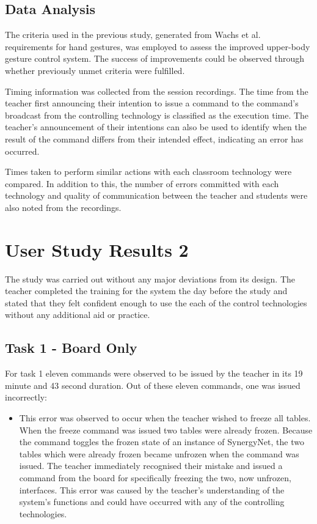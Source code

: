 \documentclass[manuscript, review, screen]{acmart}
\begin{document}
\subsection{Data Analysis}

The criteria used in the previous study, generated from Wachs et al.~\cite{Wachs2011} requirements for hand gestures, was employed to assess the improved upper-body gesture control system.
The success of improvements could be observed through whether previously unmet criteria were fulfilled.



Timing information was collected from the session recordings.
The time from the teacher first announcing their intention to issue a command to the command's broadcast from the controlling technology is classified as the execution time.
The teacher's announcement of their intentions can also be used to identify when the result of the command differs from their intended effect, indicating an error has occurred.

Times taken to perform similar actions with each classroom technology were compared.
In addition to this, the number of errors committed with each technology and quality of communication between the teacher and students were also noted from the recordings.



\section{User Study Results 2}
\label{sec:results2}  


The study was carried out without any major deviations from its design.
The teacher completed the training for the system the day before the study and stated that they felt confident enough to use the each of the control technologies without any additional aid or practice.

\subsection{Task 1 - Board Only}
\label{sec:results:task1}  

For task 1 eleven commands were observed to be issued by the teacher in its 19 minute and 43 second duration.
Out of these eleven commands, one was issued incorrectly:

\begin{itemize}
\item This error was observed to occur when the teacher wished to freeze all tables.
When the freeze command was issued two tables were already frozen.
Because the command toggles the frozen state of an instance of SynergyNet, the two tables which were already frozen became unfrozen when the command was issued.
The teacher immediately recognised their mistake and issued a command from the board for specifically freezing the two, now unfrozen, interfaces.
This error was caused by the teacher's understanding of the system's functions and could have occurred with any of the controlling technologies.
\end{itemize}
\end{document}
